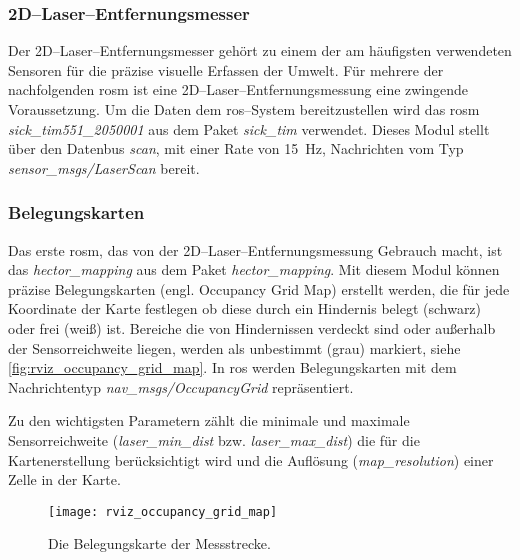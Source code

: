 \begin{comment}
--------------------------------------------------------------------------------
- \url{http://wiki.ros.org/sick_tim}
\end{comment}
\subsubsection{2D--Laser--Entfernungsmesser}

Der 2D--Laser--Entfernungsmesser gehört zu einem der am häufigsten verwendeten Sensoren für die präzise visuelle Erfassen der Umwelt. Für mehrere der nachfolgenden \Gls{rosm} ist eine 2D--Laser--Entfernungsmessung eine zwingende Voraussetzung. Um die Daten dem \Gls{ros}--System bereitzustellen wird das \Gls{rosm} \textit{sick\_tim551\_2050001} aus dem Paket \textit{sick\_tim} verwendet. Dieses Modul stellt über den Datenbus \textit{scan}, mit einer Rate von \SI{15}{\hertz}, Nachrichten vom Typ \textit{sensor\_msgs/LaserScan} bereit.


\begin{comment}
--------------------------------------------------------------------------------
- \url{http://wiki.ros.org/hector_mapping}
\end{comment}
\subsubsection{Belegungskarten}

Das erste \Gls{rosm}, das von der 2D--Laser--Entfernungsmessung Gebrauch macht, ist das \textit{hector\_mapping} aus dem Paket \textit{hector\_mapping}. Mit diesem Modul können präzise Belegungskarten (engl. Occupancy Grid Map) erstellt werden, die für jede Koordinate der Karte festlegen ob diese durch ein Hindernis belegt (schwarz) oder frei (weiß) ist. Bereiche die von Hindernissen verdeckt sind oder außerhalb der Sensorreichweite liegen, werden als unbestimmt (grau) markiert, siehe \autoref{fig:rviz_occupancy_grid_map}. In \Gls{ros} werden Belegungskarten mit dem Nachrichtentyp \textit{nav\_msgs/OccupancyGrid} repräsentiert.

Zu den wichtigsten Parametern zählt die minimale und maximale Sensorreichweite (\textit{laser\_min\_dist} bzw. \textit{laser\_max\_dist}) die für die Kartenerstellung berücksichtigt wird und die Auflösung (\textit{map\_resolution}) einer Zelle in der Karte.

\begin{figure}[h]
	\centering
	\texttt{[image: rviz\_occupancy\_grid\_map]}
	\caption{Die Belegungskarte der Messstrecke.}
	\label{fig:rviz_occupancy_grid_map}
\end{figure}
 

